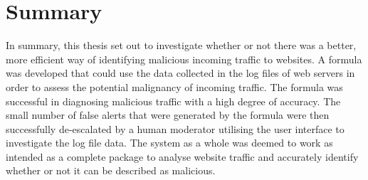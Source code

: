 \section{Summary}

In summary, this thesis set out to investigate whether or not there was a better, more efficient way of identifying malicious incoming traffic to websites. A formula was developed that could use the data collected in the log files of web servers in order to assess the potential malignancy of incoming traffic. The formula was successful in diagnosing malicious traffic with a high degree of accuracy. The small number of false alerts that were generated by the formula were then successfully de-escalated by a human moderator utilising the user interface to investigate the log file data. The system as a whole was deemed to work as intended as a complete package to analyse website traffic and accurately identify whether or not it can be described as malicious.